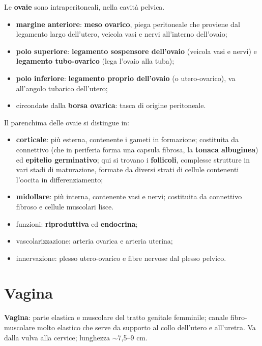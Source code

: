 Le \textbf{ovaie} sono intraperitoneali, nella cavità pelvica.
\begin{itemize}
  \item \textbf{margine anteriore}: \textbf{meso ovarico}, piega peritoneale che proviene dal
    legamento largo dell'utero, veicola vasi e nervi all'interno dell'ovaio;
  \item \textbf{polo superiore}: \textbf{legamento sospensore dell'ovaio} (veicola vasi e nervi) e
    \textbf{legamento tubo-ovarico} (lega l'ovaio alla tuba);
  \item \textbf{polo inferiore}: \textbf{legamento proprio dell'ovaio} (o utero-ovarico), va
    all'angolo tubarico dell'utero;
  \item circondate dalla \textbf{borsa ovarica}: tasca di origine peritoneale.
\end{itemize}

Il parenchima delle ovaie si distingue in:
\begin{itemize}
  \item \textbf{corticale}: più esterna, contenente i gameti in formazione; costituita da
    connettivo (che in periferia forma una capsula fibrosa, la \textbf{tonaca albuginea}) ed
    \textbf{epitelio germinativo}; qui si trovano i \textbf{follicoli}, complesse strutture in
    vari stadi di maturazione, formate da diversi strati di cellule contenenti l'oocita in
    differenziamento;
  \item \textbf{midollare}: più interna, contenente vasi e nervi; costituita da connettivo fibroso
    e cellule muscolari lisce.
\end{itemize}

\begin{itemize}
  \item funzioni: \textbf{riproduttiva} ed \textbf{endocrina};
  \item vascolarizzazione: arteria ovarica e arteria uterina;
  \item innervazione: plesso utero-ovarico e fibre nervose dal plesso pelvico.
\end{itemize}

\section{Vagina}

\textbf{Vagina}: parte elastica e muscolare del tratto genitale femminile; canale
fibro-muscolare molto elastico che serve da supporto al collo dell'utero e all'uretra. Va dalla
vulva alla cervice; lunghezza $\sim$7,5--9 cm.

